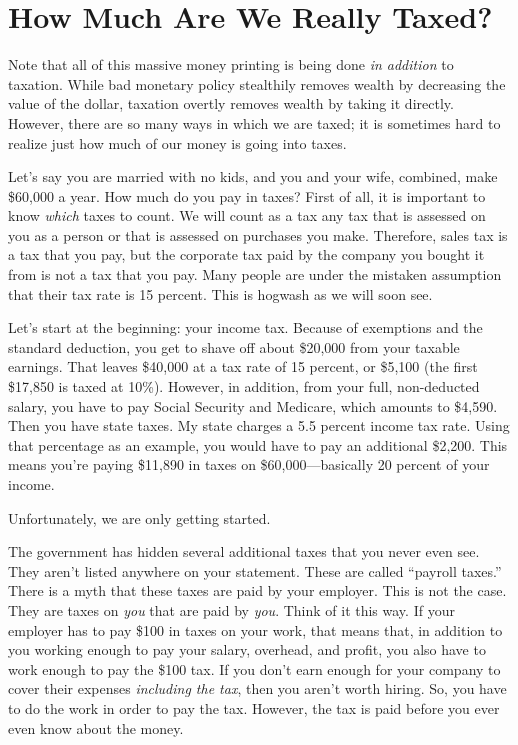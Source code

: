 \section{How Much Are We Really Taxed?}

Note that all of this massive money printing is being done \textit{in
addition }to taxation. While bad monetary policy stealthily removes
wealth by decreasing the value of the dollar, taxation overtly removes
wealth by taking it directly. However, there are so many ways in which
we are taxed; it is sometimes hard to realize just how much of our
money is going into taxes.

Let’s say you are married with no kids, and you and your wife, combined,
make \$60,000 a year. How much do you pay in taxes?  First of all, it
is important to know \textit{which} taxes to count. We will count as a
tax any tax that is assessed on you as a person or that is assessed on
purchases you make. Therefore, sales tax is a tax that you pay, but the
corporate tax paid by the company you bought it from is not a tax that
you pay. Many people are under the mistaken assumption that their tax
rate is 15 percent. This is hogwash as we will soon see.

Let’s start at the beginning: your income tax. Because of exemptions and
the standard deduction, you get to shave off about \$20,000 from your
taxable earnings.
That leaves \$40,000 at a tax rate of 15 percent, or \$5,100 (the first
\$17,850 is taxed at 10\%). However, in addition, from your full,
non-deducted salary, you have to pay Social Security and Medicare,
which amounts to \$4,590. Then you have state taxes. My state charges a
5.5 percent income tax
rate. Using that
percentage as an example, you would have to pay an additional \$2,200.
This means you’re
paying \$11,890 in taxes on \$60,000—basically 20 percent of
your income. 

Unfortunately, we are
only getting started.

The government has hidden several additional taxes that you never even
see. They aren’t listed anywhere on your statement. These are called
“payroll taxes.”  There is a myth that these taxes are paid by your
employer. This is not the case. They are taxes on \textit{you }that are
paid by\textit{ you}. Think of it this way. If your employer has to pay
\$100 in taxes on
your work, that means that, in addition to you working enough to pay
your salary, overhead, and profit, you also have to work enough to pay
the \$100 tax. If you don’t earn enough for your company to cover their
expenses \textit{including the tax}, then you aren’t worth hiring. So,
you have to do the work in order to pay the tax. However, the tax is
paid before you ever even know about the money.

